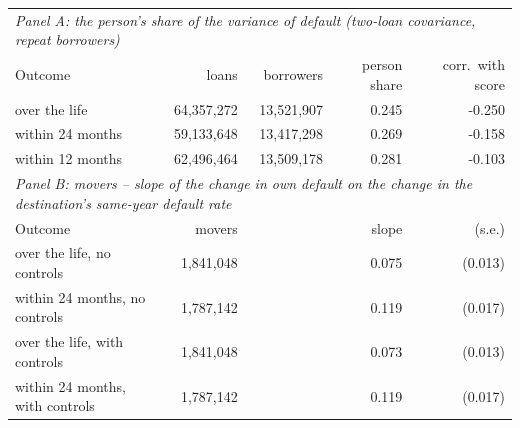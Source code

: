 \begin{tabular}{lrrrr}
\toprule
\multicolumn{5}{l}{\emph{Panel A: the person's share of the variance of default (two-loan covariance, repeat borrowers)}} \\
Outcome & loans & borrowers & person share & corr.\ with score \\
\midrule
over the life & 64,357,272 & 13,521,907 & 0.245 & -0.250 \\
within 24 months & 59,133,648 & 13,417,298 & 0.269 & -0.158 \\
within 12 months & 62,496,464 & 13,509,178 & 0.281 & -0.103 \\
\midrule
\multicolumn{5}{l}{\emph{Panel B: movers -- slope of the change in own default on the change in the destination's same-year default rate}} \\
Outcome & movers & & slope & (s.e.) \\
\midrule
over the life, no controls & 1,841,048 & & 0.075 & (0.013) \\
within 24 months, no controls & 1,787,142 & & 0.119 & (0.017) \\
over the life, with controls & 1,841,048 & & 0.073 & (0.013) \\
within 24 months, with controls & 1,787,142 & & 0.119 & (0.017) \\
\bottomrule
\end{tabular}
